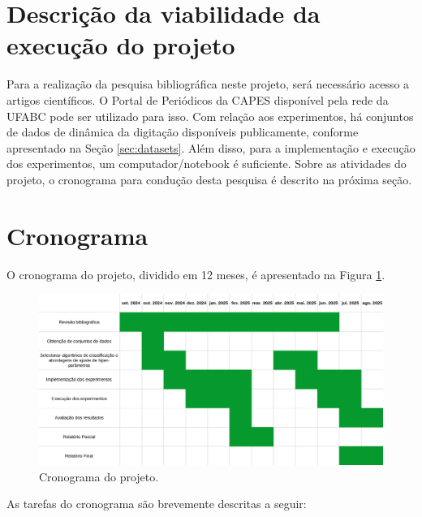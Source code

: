 \section{Descrição da viabilidade da execução do projeto}
\label{sec:viabilidade}

Para a realização da pesquisa bibliográfica neste projeto, será necessário acesso a artigos científicos. O Portal de Periódicos da CAPES disponível pela rede da UFABC pode ser utilizado para isso. Com relação aos experimentos, há conjuntos de dados de dinâmica da digitação disponíveis publicamente, conforme apresentado na Seção \ref{sec:datasets}. Além disso, para a implementação e execução dos experimentos, um computador/notebook é suficiente. Sobre as atividades do projeto, o cronograma para condução desta pesquisa é descrito na próxima seção.

\newpage

\section{Cronograma}
\label{sec:cronograma}

O cronograma do projeto, dividido em 12 meses, é apresentado na Figura \ref{fig:cronograma}.

\begin{figure}[H]
    \caption{Cronograma do projeto.}
    \label{fig:cronograma}
    \centering
    \includegraphics[width=\textwidth]{cronograma.png}    
\end{figure}

As tarefas do cronograma são brevemente descritas a seguir:

